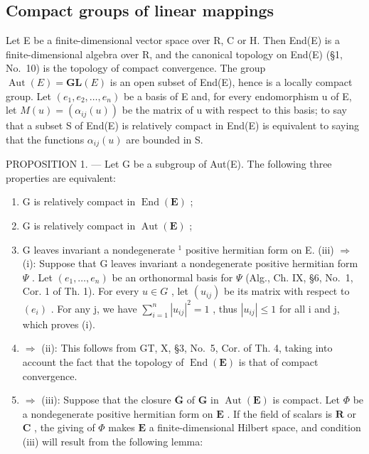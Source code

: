 \subsection{Compact groups of linear mappings}

Let E be a finite-dimensional vector space over R, C or H. Then End(E) is a finite-dimensional algebra over R, and the canonical topology on End(E) (§1, No.~10) is the topology of compact convergence. The group \(\operatorname{Aut}(E) = \mathbf{GL}(E)\) is an open subset of End(E), hence is a locally compact group. Let \((e_{1}, e_{2}, \ldots, e_{n})\) be a basis of E and, for every endomorphism u of E, let \(M(u) = (\alpha_{ij}(u))\) be the matrix of u with respect to this basis; to say that a subset S of End(E) is relatively compact in End(E) is equivalent to saying that the functions \(\alpha_{ij}(u)\) are bounded in S.

PROPOSITION 1. --- Let G be a subgroup of Aut(E). The following three properties are equivalent:

\begin{enumerate}
\def\labelenumi{(\roman{enumi})}
\item
  G is relatively compact in \(\operatorname{End}(\mathbf{E})\) ;
\item
  G is relatively compact in \(\operatorname{Aut}(\mathbf{E})\) ;
\item
  G leaves invariant a nondegenerate \(^{1}\) positive hermitian form on E. (iii) \(\Rightarrow\) (i): Suppose that G leaves invariant a nondegenerate positive hermitian form \(\Psi\) . Let \((e_{1},\ldots,e_{n})\) be an orthonormal basis for \(\Psi\) (Alg., Ch. IX, §6, No.~1, Cor. 1 of Th. 1). For every \(u\in G\) , let \((u_{ij})\) be its matrix with respect to \((e_{i})\) . For any j, we have \(\sum_{i=1}^{n}|u_{ij}|^{2}=1\) , thus \(|u_{ij}|\leqslant1\) for all i and j, which proves (i).
\item
  \(\Rightarrow\) (ii): This follows from GT, X, §3, No.~5, Cor. of Th. 4, taking into account the fact that the topology of \(\operatorname{End}(\mathbf{E})\) is that of compact convergence.
\item
  \(\Rightarrow\) (iii): Suppose that the closure \(\overline{\mathbf{G}}\) of \(\mathbf{G}\) in \(\operatorname{Aut}(\mathbf{E})\) is compact. Let \(\Phi\) be a nondegenerate positive hermitian form on \(\mathbf{E}\) . If the field of scalars is \(\mathbf{R}\) or \(\mathbf{C}\) , the giving of \(\Phi\) makes \(\mathbf{E}\) a finite-dimensional Hilbert space, and condition (iii) will result from the following lemma:
\end{enumerate}

